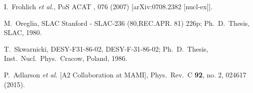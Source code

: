 \documentclass[aps,prc,twocolumn,floatfix,showpacs,preprintnumbers,amsmath,amssymb,superscriptaddress,linenumbers]{revtex4-1}
\begin{document}
\begin{thebibliography}{99}
 I.~Frohlich {\it et al.}, 
	PoS ACAT {\bf }, 076 (2007) [arXiv:0708.2382 [nucl-ex]].

  M.~Oreglia,
  SLAC Stanford - SLAC-236 (80,REC.APR. 81) 226p; 
  Ph.~D.~Thesis, SLAC, 1980.

  T.~Skwarnicki,
  DESY-F31-86-02, DESY-F-31-86-02;
  Ph.~D.~Thesis, Inst.\ Nucl.\ Phys.\ Cracow, Poland, 1986.

  P.~Adlarson {\it et al.} [A2 Collaboration at MAMI],
  Phys.\ Rev.\ C {\bf 92}, no. 2, 024617 (2015).
\end{thebibliography}
\end{document}
